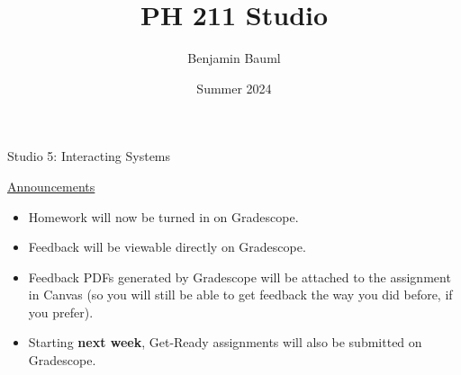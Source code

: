 \documentclass[]{article}
\title{PH 211 Studio \Week}
\author{Benjamin Bauml}
\date{Summer 2024}
\begin{document}
\begin{TeacherMargin}

\end{TeacherMargin}
\begin{PresentSpace}
\begin{center}
	\huge Studio 5: Interacting Systems \\
	\vspace{1cm}
\end{center}
\underline{Announcements}
\begin{itemize}
	\item Homework will now be turned in on Gradescope.
	\item Feedback will be viewable directly on Gradescope.
	\item Feedback PDFs generated by Gradescope will be attached to the assignment in Canvas (so you will still be able to get feedback the way you did before, if you prefer).
	\item Starting \textbf{next week}, Get-Ready assignments will also be submitted on Gradescope.
\end{itemize}
\end{PresentSpace}
\newpage
\end{document}
